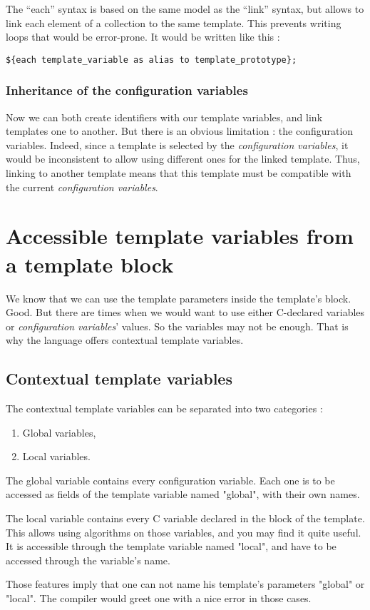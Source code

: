 \documentclass[american]{rtxreport}
\begin{document}
The “each” syntax is based on the same model as the “link” syntax, but allows to
link each element of a collection to the same template. This prevents writing
loops that would be error-prone. It would be written like this :

\begin{lstlisting}
${each template_variable as alias to template_prototype};
\end{lstlisting}


\subsubsection{Inheritance of the configuration variables}

Now we can both create identifiers with our template variables, and link
templates one to another. But there is an obvious limitation : the configuration
variables. Indeed, since a template is selected by the \emph{configuration
variables}, it would be inconsistent to allow using different ones for the
linked template.  Thus, linking to another template means that this template
must be compatible with the current \emph{configuration variables}.


\section{Accessible template variables from a template block}

We know that we can use the template parameters inside the template's block.
Good. But there are times when we would want to use either C-declared variables
or \emph{configuration variables}' values. So the variables may not be enough.
That is why the language offers contextual template variables.

\subsection{Contextual template variables}

The contextual template variables can be separated into two categories :
\begin{enumerate}
    \item Global variables,
    \item Local variables.
\end{enumerate}

The global variable contains every configuration variable. Each one is to be
accessed as fields of the template variable named "global", with their own
names.

The local variable contains every C variable declared in the block of the
template. This allows using algorithms on those variables, and you may find it
quite useful. It is accessible through the template variable named "local", and
have to be accessed through the variable's name.

Those features imply that one can not name his template's parameters "global"
or "local". The compiler would greet one with a nice error in those cases.
\end{document}

